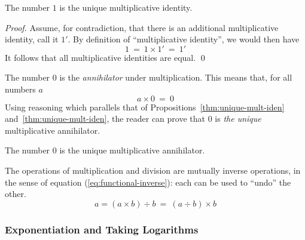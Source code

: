 \begin{prop}
\label{thm:unique-mult-iden}
The number $1$ is the unique multiplicative identity.
\end{prop}

\begin{proof}
Assume, for contradiction, that there is an additional multiplicative identity, call it $1'$.  By definition of ``multiplicative identity'', we would then have
\[ 1 \ = \ 1 \times 1' \ = \ 1' \]
It follows that all multiplicative identities are equal.  \qed
\end{proof}

\medskip


The number $0$ is the {\it annihilator} under multiplication.  This means that, for all numbers $a$
\[ a \times 0 \ = \ 0 \]
Using reasoning which parallels that of Propositions~\ref{thm:unique-mult-iden} and~\ref{thm:unique-mult-iden}, the reader can prove that $0$ is {\em the unique} multiplicative annihilator.

\begin{prop}
The number $0$ is the unique multiplicative annihilator.
\end{prop}

\medskip


The operations of multiplication and division are mutually inverse operations, in the sense of equation (\ref{eq:functional-inverse}): each can be used to ``undo'' the other.
\[ a = (a \times b) \div b \ = \ (a \div b) \times b  \]

\subsubsection{Exponentiation and Taking Logarithms}
\label{sec:exponentiation}


